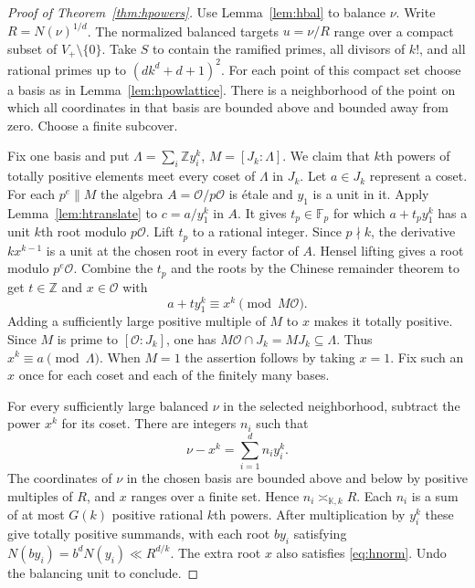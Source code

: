 \documentclass[11pt,letterpaper]{article}
\theoremstyle{definition}
\numberwithin{equation}{section}
\begin{document}
\begin{proof}[Proof of Theorem~\ref{thm:hpowers}]
Use Lemma~\ref{lem:hbal} to balance $\nu$. Write $R=N(\nu)^{1/d}$. The normalized balanced targets $u=\nu/R$ range over a compact subset
of $V_+\setminus\{0\}$. Take $S$ to contain the ramified primes, all
divisors of $k!$, and all rational primes up to $(dk^d+d+1)^2$.
For each point of this compact set choose a basis as in
Lemma~\ref{lem:hpowlattice}. There is a neighborhood of the point
on which all coordinates in that basis are bounded above and
bounded away from zero. Choose a finite subcover.

Fix one basis and put $\Lambda=\sum_i\mathbb Z y_i^k$, $M=[J_k:\Lambda]$.
We claim that $k$th powers of totally positive elements meet every
coset of $\Lambda$ in $J_k$. Let $a\in J_k$ represent a coset.
For each $p^e\parallel M$ the algebra $A=\mathcal O/p\mathcal O$ is
\'etale and $y_1$ is a unit in it. Apply Lemma~\ref{lem:htranslate}
to $c=a/y_1^k$ in $A$. It gives $t_p\in\mathbb F_p$ for which
$a+t_p y_1^k$ has a unit $k$th root modulo $p\mathcal O$.
Lift $t_p$ to a rational integer. Since $p\nmid k$, the derivative
$kx^{k-1}$ is a unit at the chosen root in every factor of $A$.
Hensel lifting gives a root modulo $p^e\mathcal O$.
Combine the $t_p$ and the roots by the Chinese remainder theorem to get
$t\in\mathbb Z$ and $x\in\mathcal O$ with
\[
                      a+t y_1^k\equiv x^k\pmod {M\mathcal O}.
\]
Adding a sufficiently large positive multiple of $M$ to $x$ makes
it totally positive. Since $M$ is prime to $[\mathcal O:J_k]$,
one has $M\mathcal O\cap J_k=MJ_k\subseteq\Lambda$.
Thus $x^k\equiv a\pmod\Lambda$. When $M=1$ the assertion follows
by taking $x=1$. Fix such an $x$ once for each coset and each of
the finitely many bases.

For every sufficiently large balanced $\nu$ in the selected
neighborhood, subtract the power $x^k$ for its coset. There are
integers $n_i$ such that
\[
                        \nu-x^k=\sum_{i=1}^d n_i y_i^k .
\]
The coordinates of $\nu$ in the chosen basis are bounded above and
below by positive multiples of $R$, and $x$ ranges over a finite set.
Hence $n_i\asymp_{\mathbb K,k}R$. Each $n_i$ is a sum of at most $G(k)$
positive rational $k$th powers. After multiplication by $y_i^k$ these
give totally positive summands, with each root $b y_i$ satisfying
$N(b y_i)=b^dN(y_i)\ll R^{d/k}$. The extra root $x$ also satisfies
\eqref{eq:hnorm}. Undo the balancing unit to conclude.
\end{proof}
\end{document}
